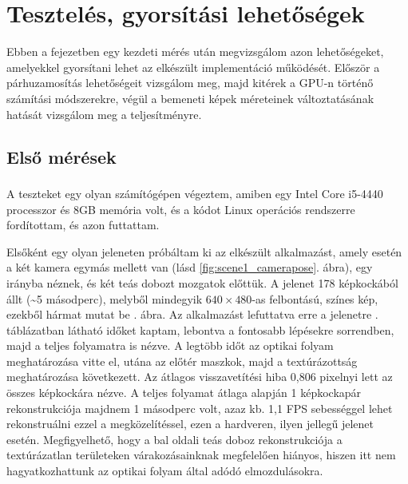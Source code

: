\chapter{Tesztelés, gyorsítási lehetőségek}

Ebben a fejezetben egy kezdeti mérés után megvizsgálom azon lehetőségeket, amelyekkel gyorsítani lehet az elkészült implementáció működését. Először a párhuzamosítás lehetőségeit vizsgálom meg, majd kitérek a GPU-n történő számítási módszerekre, végül a bemeneti képek méreteinek változtatásának hatását vizsgálom meg a teljesítményre.

\section{Első mérések}

A teszteket egy olyan számítógépen végeztem, amiben egy Intel\textsuperscript{\textregistered} Core\texttrademark{} i5-4440 processzor és 8GB memória volt, és a kódot Linux operációs rendszerre fordítottam, és azon futtattam.

Elsőként egy olyan jeleneten próbáltam ki az elkészült alkalmazást, amely esetén a két kamera egymás mellett van (lásd \ref{fig:scene1_camerapose}. ábra), egy irányba néznek, és két teás dobozt mozgatok előttük. A jelenet 178 képkockából állt (\textasciitilde 5 másodperc), melyből mindegyik $640\times 480$-as felbontású, színes kép, ezekből hármat mutat be . ábra. Az alkalmazást lefuttatva erre a jelenetre . táblázatban látható időket kaptam, lebontva a fontosabb lépésekre sorrendben, majd a teljes folyamatra is nézve. A legtöbb időt az optikai folyam meghatározása vitte el, utána az előtér maszkok, majd a textúrázottság meghatározása következett. Az átlagos visszavetítési hiba 0,806 pixelnyi lett az összes képkockára nézve. A teljes folyamat átlaga alapján 1 képkockapár rekonstrukciója majdnem 1 másodperc volt, azaz kb. 1,1 FPS sebességgel lehet rekonstruálni ezzel a megközelítéssel, ezen a hardveren, ilyen jellegű jelenet esetén. Megfigyelhető, hogy a bal oldali teás doboz rekonstrukciója a textúrázatlan területeken várakozásainknak megfelelően hiányos, hiszen itt nem hagyatkozhattunk az optikai folyam által adódó elmozdulásokra.

